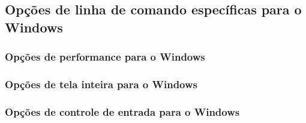 \documentclass[letterpaper,10pt,brazil]{sphinxmanual}
\begin{document}
\subsection{Opções de linha de comando específicas para o Windows}
\label{commandline/commandline-index:opcoes-de-linha-de-comando-especificas-para-o-windows}

\subsubsection{Opções de performance para o Windows}
\label{commandline/commandline-index:opcoes-de-performance-para-o-windows}
\begin{DUlineblock}{0em}
\item[] {\hyperref[commandline/windowsconfig:mame\string-wcommandline\string-priority]{}}
\item[] {\hyperref[commandline/windowsconfig:mame\string-wcommandline\string-profile]{}}
\end{DUlineblock}


\subsubsection{Opções de tela inteira para o Windows}
\label{commandline/commandline-index:opcoes-de-tela-inteira-para-o-windows}
\begin{DUlineblock}{0em}
\item[] {\hyperref[commandline/windowsconfig:mame\string-wcommandline\string-triplebuffer]{}}
\item[] {\hyperref[commandline/windowsconfig:mame\string-wcommandline\string-fullscreenbrightness]{}}
\item[] {\hyperref[commandline/windowsconfig:mame\string-wcommandline\string-fullscreencontrast]{}}
\item[] {\hyperref[commandline/windowsconfig:mame\string-wcommandline\string-fullscreengamma]{}}
\end{DUlineblock}


\subsubsection{Opções de controle de entrada para o Windows}
\label{commandline/commandline-index:opcoes-de-controle-de-entrada-para-o-windows}
\begin{DUlineblock}{0em}
\item[] {\hyperref[commandline/windowsconfig:mame\string-wcommandline\string-duallightgun]{}}
\end{DUlineblock}
\end{document}
